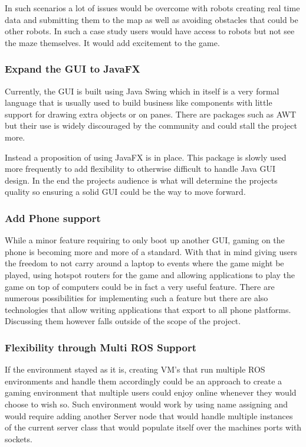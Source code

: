\documentclass{report}
\begin{document}
        In such scenarios a lot of issues would be overcome with robots creating real time data and submitting them to the map as well as avoiding obstacles that could be other robots. In such a case study users would have access to robots but not see the maze themselves. It would add excitement to the game.

      \subsubsection{Expand the GUI to JavaFX}
        Currently, the GUI is built using Java Swing which in itself is a very formal language that is usually used to build business like components with little support for drawing extra objects or on panes. There are packages such as AWT but their use is widely discouraged by the community and could stall the project more.

        Instead a proposition of using JavaFX is in place. This package is slowly used more frequently to add flexibility to otherwise difficult to handle Java GUI design. In the end the projects audience is what will determine the projects quality so ensuring a solid GUI could be the way to move forward.

      \subsubsection{Add Phone support}
        While a minor feature requiring to only boot up another GUI, gaming on the phone is becoming more and more of a standard. With that in mind giving users the freedom to not carry around a laptop to events where the game might be played, using hotspot routers for the game and allowing applications to play the game on top of computers could be in fact a very useful feature. There are numerous possibilities for implementing such a feature but there are also technologies that allow writing applications that export to all phone platforms. Discussing them however falls outside of the scope of the project.

      \subsubsection{Flexibility through Multi ROS Support}
        If the environment stayed as it is, creating VM's that run multiple ROS environments and handle them accordingly could be an approach to create a gaming environment that multiple users could enjoy online whenever they would choose to wish so. Such environment would work by using name assigning and would require adding another Server node that would handle multiple instances of the current server class that would populate itself over the machines ports with sockets. 
\end{document}
